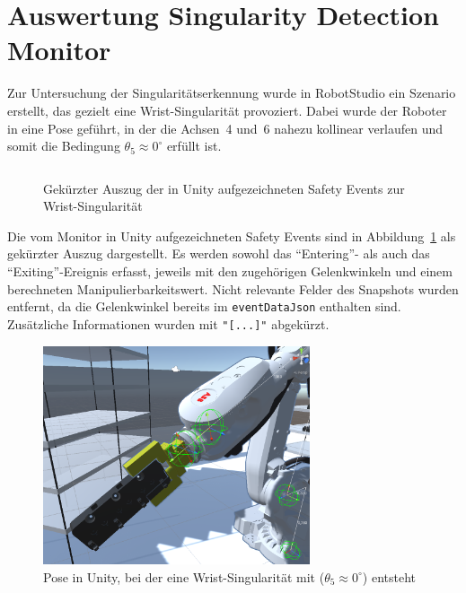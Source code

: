 \newpage
\section{Auswertung Singularity Detection Monitor}
\label{sec:singularityauswertung}
Zur Untersuchung der Singularitätserkennung wurde in RobotStudio ein Szenario erstellt,
das gezielt eine Wrist-Singularität provoziert. Dabei wurde der Roboter in eine Pose
geführt, in der die Achsen~4 und~6 nahezu kollinear verlaufen und somit die Bedingung
$\theta_{5} \approx 0^\circ$ erfüllt ist.

\begin{figure}[H]
	\inputminted[fontsize=\footnotesize,breaklines]{json}{code-snippets/singularityerror.json}
	\caption{Gekürzter Auszug der in Unity aufgezeichneten Safety Events zur Wrist-Singularität}
	\label{lst:singularity_json}
\end{figure}

\noindent
Die vom Monitor in Unity aufgezeichneten Safety Events sind in
Abbildung~\ref{lst:singularity_json} als gekürzter Auszug dargestellt. Es werden sowohl
das \enquote{Entering}- als auch das \enquote{Exiting}-Ereignis erfasst, jeweils mit den
zugehörigen Gelenkwinkeln und einem berechneten Manipulierbarkeitswert. Nicht relevante
Felder des Snapshots wurden entfernt, da die Gelenkwinkel bereits im \texttt{eventDataJson}
enthalten sind. Zusätzliche Informationen wurden mit \texttt{"[...]"}
abgekürzt.\\

\noindent

\begin{figure}[H]
	\centering
	\includegraphics[width=0.7\textwidth]{figures/wristSingularity.png}
	\caption{Pose in Unity, bei der eine Wrist-Singularität mit ($\theta_{5} \approx 0^\circ$) entsteht}
	\label{fig:wrist_singularity}
\end{figure}

